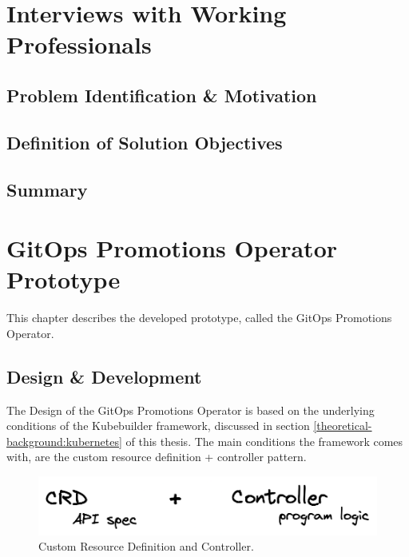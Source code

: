 

\chapter{Interviews with Working Professionals}

\section{Problem Identification \& Motivation}
\section{Definition of Solution Objectives}
\section{Summary}



\chapter{GitOps Promotions Operator Prototype}

This chapter describes the developed prototype,
called the GitOps Promotions Operator.

\section{Design \& Development}

The Design of the GitOps Promotions Operator
is based on the underlying conditions of the Kubebuilder framework,
discussed in section \ref{theoretical-background:kubernetes} of this thesis.
The main conditions the framework comes with, are the
custom resource definition + controller pattern.

\begin{figure}[h]
	\centering
	\includegraphics[width=1.00\linewidth]{assets/crd-and-controller.png}
	\caption{Custom Resource Definition and Controller.
	}
	\label{fig:crd-and-controller}	
\end{figure}

